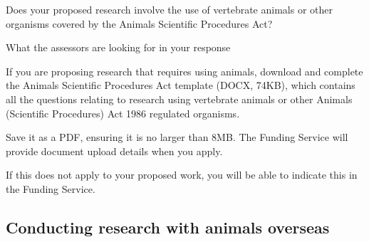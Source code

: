\documentclass[11pt]{article}
\newenvironment{instruction}{%
    \begin{tcolorbox}[breakable,colback=red!5,colframe=red,title=Instruction]%
	}{%
    	\end{tcolorbox}%
	}
\begin{document}
\begin{instruction}

Does your proposed research involve the use of vertebrate animals or other
organisms covered by the Animals Scientific Procedures Act?

What the assessors are looking for in your response

If you are proposing research that requires using animals, download and
complete the Animals Scientific Procedures Act template (DOCX, 74KB),
which contains all the questions relating to research using vertebrate animals or
other Animals (Scientific Procedures) Act 1986 regulated organisms.

Save it as a PDF, ensuring it is no larger than 8MB. The Funding Service will
provide document upload details when you apply.

If this does not apply to your proposed work, you will be able to indicate
this in the Funding Service.

\end{instruction}

\pagebreak
\subsection{Conducting research with animals overseas}
\end{document}
